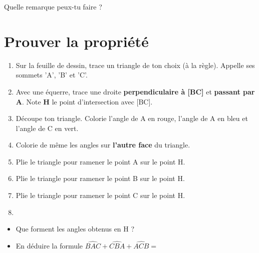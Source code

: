 \documentclass[a4paper,11pt]{article}
\begin{document}
\vspace{1em}
Quelle remarque peux-tu faire ? \dotfill

\section{Prouver la propriété}


\vspace{0.5em}

\begin{enumerate}
	\item Sur la feuille de dessin, trace un triangle de ton choix (à la règle). Appelle ses sommets 'A', 'B' et 'C'.
	\item Avec une équerre, trace une droite \textbf{perpendiculaire à [BC]} et \textbf{passant par A}. Note \textbf{H} le point d'intersection avec [BC].
	\item Découpe ton triangle. Colorie l'angle de A en {\color{red}rouge}, l'angle de A en {\color{blue}bleu} et l'angle de C en {\color{green}vert}.
	\item Colorie de même les angles sur \textbf{l'autre face} du triangle.
	\item Plie le triangle pour ramener le point A sur le point H.
	\item Plie le triangle pour ramener le point B sur le point H.
	\item Plie le triangle pour ramener le point C sur le point H.
	\item {}
\end{enumerate}


\begin{itemize}
	\item Que forment les angles obtenus en H ? \dotfill
	\item En déduire la formule $\widehat{BAC} + \widehat{CBA} + \widehat{ACB} = $ \dotfill
\end{itemize}
\end{document}
